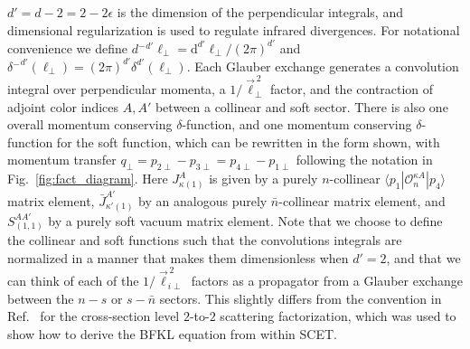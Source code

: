 \documentclass[letterpaper,11pt]{article}
\newcommand{\fig}[1]{Fig.~\ref{fig:#1}}
\newcommand{\df}{\mathrm{d}}
\newcommand{\ddslash}{{d\!\!{}^-}}
\newcommand{\deltaslash}{{\delta\!\!\!{}^-}}
\newcommand{\bn}{{\bar n}}
\begin{document}
$d'=d-2=2-2\epsilon$ is the dimension of the perpendicular integrals, and dimensional regularization is used to regulate infrared divergences. For notational convenience we define 
$\ddslash\!^{d'\!}\ell_\perp = \df^{d'\!}\ell_\perp/(2\pi)^{d'}$ and 
$\deltaslash^{d'\!\!}(\ell_\perp) = (2\pi)^{d'}\delta^{d'}(\ell_\perp)$. 
Each Glauber exchange generates a convolution integral over perpendicular momenta, a $1/\vec \ell_\perp^{\,2}$ factor, and the contraction of adjoint color indices $A, A'$ between a collinear and soft sector. 
There is also one overall momentum conserving $\delta$-function, and one momentum conserving $\delta$-function for the soft function, which can be rewritten in the form shown, with momentum transfer $q_\perp=p_{2\perp}-p_{3\perp}=p_{4\perp}-p_{1\perp}$ following the notation in \fig{fact_diagram}. 
Here $J_{\kappa(1)}^A$ is given by a purely $n$-collinear $\langle p_1| \mathcal{O}_n^{\kappa A} | p_4\rangle$ matrix element, $\bar J_{\kappa'(1)}^{A'}$ by an analogous purely $\bn$-collinear matrix element, and $S_{(1,1)}^{AA'}$ by a purely soft vacuum matrix element.
Note that we choose to define the collinear and soft functions such that the convolutions integrals are normalized in a manner that makes them dimensionless when $d'=2$, and that we can think of each of the $1/\vec\ell_{i\perp}^{\,2}$ factors as a propagator from a Glauber exchange between the $n-s$ or $s-\bn$ sectors. This slightly differs from the convention in Ref.~\cite{Rothstein:2016bsq} for the cross-section level $2$-to-$2$ scattering factorization, which was used to show how to derive the BFKL equation from within SCET.
\end{document}
